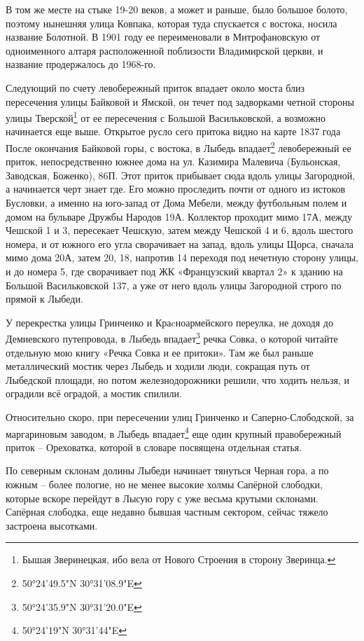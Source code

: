 В том же месте на стыке 19-20 веков, а может и раньше, было большое болото, поэтому нынешняя улица Ковпака, которая туда спускается с востока, носила название Болотной. В 1901 году ее переименовали в Митрофановскую от одноименного алтаря расположенной поблизости Владимирской церкви, и название продержалось до 1968-го.

Следующий по счету левобережный приток впадает около моста близ пересечения улицы Байковой и Ямской, он течет под задворками четной стороны улицы Тверской\footnote{Бышая Зверинецкая, ибо вела от Нового Строения в сторону Зверинца.} от ее пересечения с Большой Васильковской, а возможно начинается еще выше. Открытое русло сего притока видно на карте 1837 года\\

После окончания Байковой горы, с востока, в Лыбедь впадает\footnote{50°24'49.5"N 30°31'08.9"E} левобережный ее приток, непосредственно южнее дома на ул. Казимира Малевича (Бульонская, Заводская, Боженко), 86П. Этот приток прибывает сюда вдоль улицы Загородной, а начинается черт знает где. Его можно проследить почти от одного из истоков Бусловки, а именно на юго-запад от Дома Мебели, между футбольным полем и домом на бульваре Дружбы Народов 19А. Коллектор проходит мимо 17А, между Чешской 1 и 3, пересекает Чешскую, затем между Чешской 4 и 6, вдоль шестого номера, и от южного его угла сворачивает на запад, вдоль улицы Щорса, сначала мимо дома 20А, затем 20, 18, напротив 14 переходя под нечетную сторону улицы, и до номера 5, где сворачивает под ЖК «Французский квартал 2» к зданию на Большой Васильковской 137, а уже от него вдоль улицы Загородной строго по прямой к Лыбеди.

У перекрестка улицы Гринченко и Краcноармейского переулка, не доходя до Демиевского путепровода, в Лыбедь впадает\footnote{50°24'35.9"N 30°31'20.0"E} речка Совка, о которой читайте отдельную мою книгу «Речка Совка и ее притоки». Там же был раньше металлический мостик через Лыбедь и ходили люди, сокращая путь от Лыбедской площади, но потом железнодорожники решили, что ходить нельзя, и оградили всё оградой, а мостик спилили.

Относительно скоро, при пересечении улиц Гринченко и Саперно-Слободской, за маргариновым заводом, в Лыбедь впадает\footnote{ 50°24'19"N 30°31'44"E} еще один крупный правобережный приток – Ореховатка, которой в словаре посвящена отдельная статья.

По северным склонам долины Лыбеди начинает тянуться Черная гора, а по южным – более пологие, но не менее высокие холмы Сапёрной слободки, которые вскоре перейдут в Лысую гору с уже весьма крутыми склонами. Сапёрная слободка, еще недавно бывшая частным сектором, сейчас тяжело застроена высотками.

